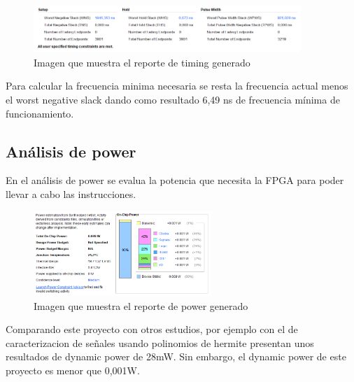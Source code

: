	\begin{figure}[h!]
		\centering
		\includegraphics[width=0.9\textwidth]{./Images/img_res_experimentales/reportetiming.png}
		\caption{Imagen que muestra el reporte de timing generado}
		\label{fig:reporteTiming}
	\end{figure} 

	Para calcular la frecuencia minima necesaria se resta la frecuencia actual menos el worst negative slack dando como resultado 6,49 ns de frecuencia mínima de funcionamiento. 

\subsection{Análisis de power}

	En el análisis de power se evalua la potencia que necesita la FPGA para poder llevar a cabo las instrucciones.

	\begin{figure}[h!]
		\centering
		\includegraphics[width=0.6\textwidth]{./Images/img_res_experimentales/reportepower.png}
		\caption{Imagen que muestra el reporte de power generado}
		\label{fig:reportePower}
	\end{figure} 

	Comparando este proyecto con otros estudios, por ejemplo con el de caracterizacion de señales usando polinomios de hermite presentan unos resultados de dynamic power de 28mW.
	Sin embargo, el dynamic power de este proyecto es menor que 0,001W.








	